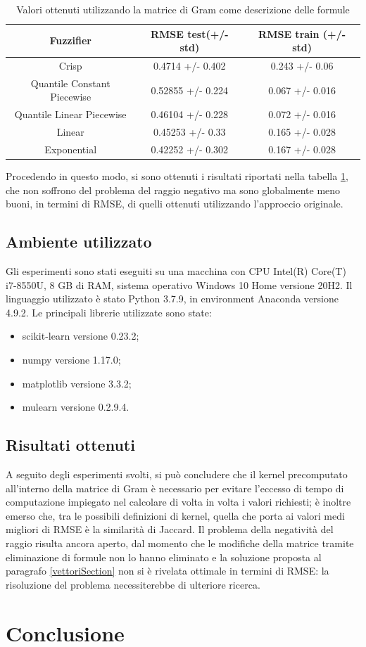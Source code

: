 \documentclass[12pt,a4paper]{report}
\begin{document}
\begin{table}[h!]
\small
\centering 	
	\begin{tabular}{|c|c|c|} 
	 \hline
	  Fuzzifier & RMSE test(+/- std) & RMSE train (+/- std)\\ [0.5ex] 
	 \hline
	 Crisp & 0.4714  +/- 0.402 & 0.243 +/- 0.06 \\ 
	 \hline
	 Quantile Constant Piecewise & 0.52855  +/- 0.224 & 0.067 +/- 0.016\\
	 \hline
	 Quantile Linear Piecewise & 0.46104  +/- 0.228	& 0.072 +/- 0.016\\
	 \hline
	 Linear &0.45253  +/- 0.33 & 0.165 +/- 0.028\\
	 \hline
	 Exponential & 0.42252  +/- 0.302 & 0.167 +/-  0.028\\ [1ex] 
	 \hline
	\end{tabular}
	\caption{Valori ottenuti utilizzando la matrice di Gram come descrizione delle formule}
	\label{table:risultatiVettore}
\end{table}

Procedendo in questo modo, si sono ottenuti i risultati riportati nella tabella \ref{table:risultatiVettore}, che non soffrono del problema del raggio negativo ma sono globalmente meno buoni, in termini di RMSE, di quelli ottenuti utilizzando l'approccio originale.



\section{Ambiente utilizzato}
Gli esperimenti sono stati eseguiti su una macchina con CPU Intel(R) Core(T) i7-8550U, 8 GB di RAM, sistema operativo Windows 10 Home versione 20H2. 
Il linguaggio utilizzato è stato Python 3.7.9, in environment Anaconda \cite{anaconda} versione 4.9.2.
Le principali librerie utilizzate sono state:
\begin{itemize}
\item scikit-learn \cite{scikit-learn} versione 0.23.2;
\item numpy \cite{numpy} versione 1.17.0;
\item matplotlib \cite{matplotlib} versione 3.3.2;
\item mulearn \cite{mulearn} versione 0.2.9.4.
\end{itemize}
\section{Risultati ottenuti}
A seguito degli esperimenti svolti, si può concludere che il kernel precomputato all'interno della matrice di Gram è necessario per evitare l'eccesso di tempo di computazione impiegato nel calcolare di volta in volta i valori richiesti; è inoltre emerso che, tra le possibili definizioni di kernel, quella che porta ai valori medi migliori di RMSE è la similarità di Jaccard.
Il problema della negatività del raggio risulta ancora aperto, dal momento che le modifiche della matrice tramite eliminazione di formule non lo hanno eliminato e la soluzione proposta al paragrafo \ref{vettoriSection} non si è rivelata ottimale in termini di RMSE: la risoluzione del problema necessiterebbe di ulteriore ricerca.

\chapter*{Conclusione}



\end{document}
